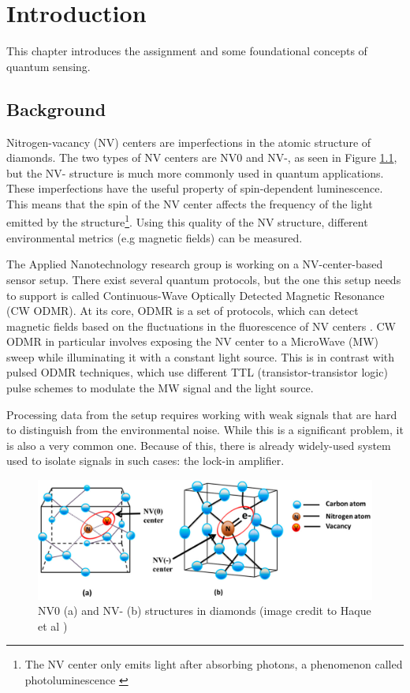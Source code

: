 \chapter{Introduction}
This chapter introduces the assignment and some foundational concepts of quantum sensing.

\section{Background}
Nitrogen-vacancy (NV) centers \cite{enwiki:1301369588} are imperfections in the atomic structure of diamonds. The two types of NV centers are NV0 and NV-, as seen in Figure \ref{fig:nvcenter}, but the NV- structure is much more commonly used in quantum applications. These imperfections have the useful property of spin-dependent luminescence. This means that the spin of the NV center affects the frequency of the light emitted by the structure\footnote{The NV center only emits light after absorbing photons, a phenomenon called photoluminescence \cite{enwiki:1309081879}}. Using this quality of the NV structure, different environmental metrics (e.g magnetic fields) can be measured. 

The Applied Nanotechnology research group is working on a NV-center-based sensor setup. There exist several quantum protocols, but the one this setup needs to support is called Continuous-Wave Optically Detected Magnetic Resonance (CW ODMR). At its core, ODMR is a set of protocols, which can detect magnetic fields based on the fluctuations in the fluorescence of NV centers \cite{enwiki:1301371272}. CW ODMR in particular involves exposing the NV center to a MicroWave (MW) sweep while illuminating it with a constant light source. This is in contrast with pulsed ODMR techniques, which use different TTL (transistor-transistor logic) pulse schemes \cite{sewani2020coherent} to modulate the MW signal and the light source.

Processing data from the setup requires working with weak signals that are hard to distinguish from the environmental noise. While this is a significant problem, it is also a very common one. Because of this, there is already widely-used system used to isolate signals in such cases: the lock-in amplifier.

\begin{figure}[ht]
	\centering
	\includegraphics[width=0.7\linewidth]{img/nv_center}
	\caption{NV0 (a) and NV- (b) structures in diamonds (image credit to Haque et al \cite{haque2017overview})}
	\label{fig:nvcenter}
\end{figure}


